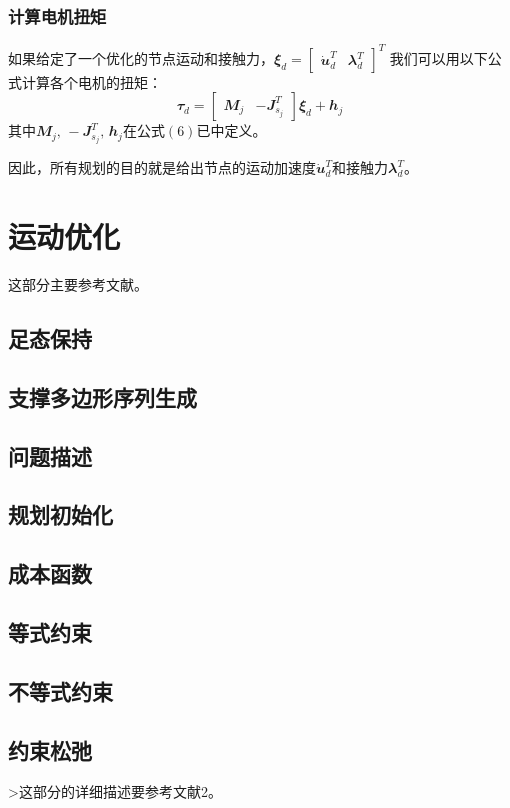 \subsection{计算电机扭矩}
如果给定了一个优化的节点运动和接触力，${\mathbfit \xi}_d = \begin{bmatrix}
\dot {\mathbfit u}_d^T & {\mathbfit \lambda}_d^T
\end{bmatrix}^T$
我们可以用以下公式计算各个电机的扭矩：
$${\mathbfit \tau}_d = \begin{bmatrix} {\mathbfit M}_j & -{\mathbfit J}^T_{s_j}\end{bmatrix} {\mathbfit \xi}_d + {\mathbfit h}_j$$
其中${\mathbfit M}_j,\, -{\mathbfit J}^T_{s_j}, \, {\mathbfit h}_j$在公式$(6)$已中定义。
\begin{note}
    因此，所有规划的目的就是给出节点的运动加速度$\dot{\mathbfit u}_d^T$和接触力${\mathbfit \lambda}_d^T$。
\end{note}




\chapter{运动优化}
这部分主要参考文献\cite[p3-6]{Bellicoso_Jenelten_Fankhauser_Gehring_Hwangbo_Hutter_2017}。

\section{足态保持}
\section{支撑多边形序列生成}
\section{问题描述}
\section{规划初始化}
\section{成本函数}
\section{等式约束}
\section{不等式约束}
\section{约束松弛}
>这部分的详细描述要参考文献2。


